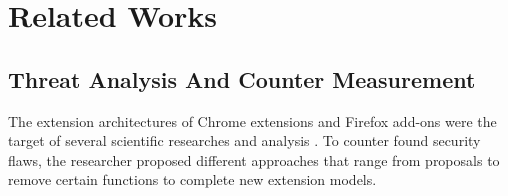 
\chapter{Related Works}

\section{Threat Analysis And Counter Measurement}
	
	The extension architectures of Chrome extensions and Firefox add-ons were the target of several scientific researches and analysis \cite{Barth10protectingbrowsers,Carlini:2012:EGC:2362793.2362800,Hallaraker:2005:DMJ:1078029.1078861,Liu12chromeextensions:,TerLouw:2007:EWB:1420581.1420583,cs2015sentinel}. To counter found security flaws, the researcher proposed different approaches that range from proposals to remove certain functions to complete new extension models. 
	
